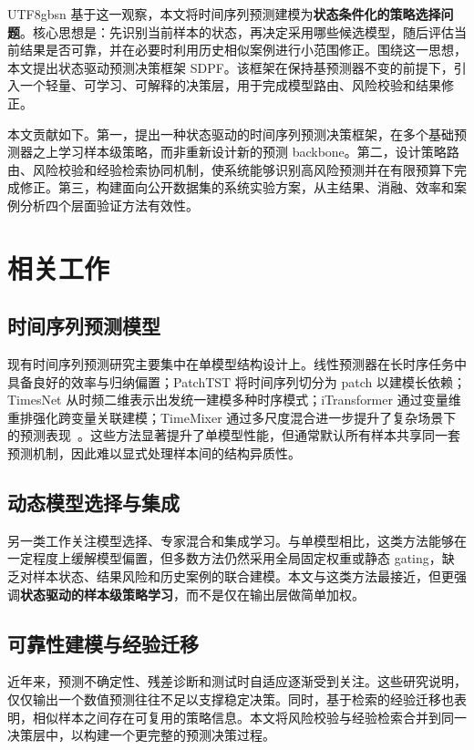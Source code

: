 \documentclass[journal,twoside,web]{ieeecolor}
\begin{document}
\begin{CJK*}{UTF8}{gbsn}
基于这一观察，本文将时间序列预测建模为\textbf{状态条件化的策略选择问题}。核心思想是：先识别当前样本的状态，再决定采用哪些候选模型，随后评估当前结果是否可靠，并在必要时利用历史相似案例进行小范围修正。围绕这一思想，本文提出状态驱动预测决策框架 SDPF。该框架在保持基预测器不变的前提下，引入一个轻量、可学习、可解释的决策层，用于完成模型路由、风险校验和结果修正。

本文贡献如下。第一，提出一种状态驱动的时间序列预测决策框架，在多个基础预测器之上学习样本级策略，而非重新设计新的预测 backbone。第二，设计策略路由、风险校验和经验检索协同机制，使系统能够识别高风险预测并在有限预算下完成修正。第三，构建面向公开数据集的系统实验方案，从主结果、消融、效率和案例分析四个层面验证方法有效性。

\section{相关工作}
\subsection{时间序列预测模型}
现有时间序列预测研究主要集中在单模型结构设计上。线性预测器在长时序任务中具备良好的效率与归纳偏置；PatchTST 将时间序列切分为 patch 以建模长依赖；TimesNet 从时频二维表示出发统一建模多种时序模式；iTransformer 通过变量维重排强化跨变量关联建模；TimeMixer 通过多尺度混合进一步提升了复杂场景下的预测表现~\cite{dlinear,patchtst,timesnet,itransformer,timemixer}。这些方法显著提升了单模型性能，但通常默认所有样本共享同一套预测机制，因此难以显式处理样本间的结构异质性。

\subsection{动态模型选择与集成}
另一类工作关注模型选择、专家混合和集成学习。与单模型相比，这类方法能够在一定程度上缓解模型偏置，但多数方法仍然采用全局固定权重或静态 gating，缺乏对样本状态、结果风险和历史案例的联合建模。本文与这类方法最接近，但更强调\textbf{状态驱动的样本级策略学习}，而不是仅在输出层做简单加权。

\subsection{可靠性建模与经验迁移}
近年来，预测不确定性、残差诊断和测试时自适应逐渐受到关注。这些研究说明，仅仅输出一个数值预测往往不足以支撑稳定决策。同时，基于检索的经验迁移也表明，相似样本之间存在可复用的策略信息。本文将风险校验与经验检索合并到同一决策层中，以构建一个更完整的预测决策过程。


\end{CJK*}
\end{document}
